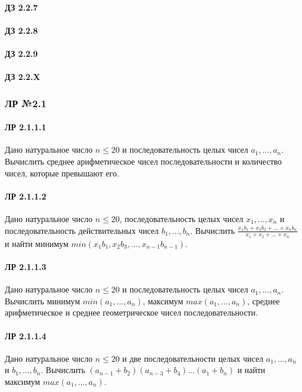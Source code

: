 \documentclass[12pt,a4paper]{report}
\begin{document}
\paragraph*{ДЗ 2.2.7}
\paragraph*{ДЗ 2.2.8}
\paragraph*{ДЗ 2.2.9}
\paragraph*{ДЗ 2.2.X}

\clearpage
\subsubsection*{ЛР №2.1}
\paragraph*{ЛР 2.1.1.1} Дано натуральное число $n \le 20$ и последовательность целых чисел $a_1, ..., a_n$. Вычислить среднее арифметическое чисел последовательности и количество чисел, которые превышают его.
\paragraph*{ЛР 2.1.1.2} Дано натуральное число $n \le 20$, последовательность целых чисел $x_1, ..., x_n$ и последовательность действительных чисел $b_1, ..., b_n$. Вычислить $\frac { x_1 b_1 + x_2 b_2 + ... + x_n b_n} { x_1 + x_2 + ... + x_n }$ и найти минимум $min(x_1 b_1, x_2 b_3, ..., x_{n-1} b_{n-1})$.
\paragraph*{ЛР 2.1.1.3} Дано натуральное число $n \le 20$ и последовательность целых чисел $a_1, ..., a_n$. Вычислить минимум $min(a_1, ..., a_n)$, максимум $max(a_1, ..., a_n)$, среднее арифметическое и среднее геометрическое чисел последовательности.
\paragraph*{ЛР 2.1.1.4} Дано натуральное число $n \le 20$ и две последовательности целых чисел $a_1, ..., a_n$ и $b_1, ..., b_n$. Вычислить $(a_{n-1} + b_2)(a_{n-3} + b_4) ... (a_1 + b_{n})$ и найти максимум $max(a_1, ..., a_n)$. 
\end{document}
